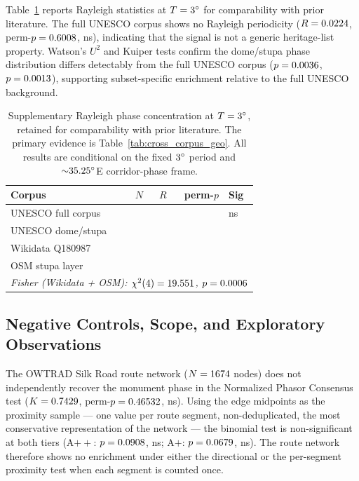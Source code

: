 \documentclass[12pt,a4paper]{article}
\newcommand{\degr}{\ifmmode^\circ\else\textdegree{}\fi}
\begin{document}
Table~\ref{tab:rayleigh_summary} reports Rayleigh statistics at
$T = 3\degr$ for comparability with prior literature. The full UNESCO
corpus shows no Rayleigh periodicity ($R = 0.0224{}$,
perm-$p = 0.6008{}$, ns), indicating that the signal is not a
generic heritage-list property. Watson's $U^2$ and Kuiper tests confirm
the dome/stupa phase distribution differs detectably from the full
UNESCO corpus ($p = 0.0036{}$,
$p = 0.0013{}$), supporting subset-specific enrichment relative to the full UNESCO background.

\begin{table}[ht]
\centering
\caption{Supplementary Rayleigh phase concentration at $T = 3\degr$,
retained for comparability with prior literature. The primary evidence
is Table~\ref{tab:cross_corpus_geo}. All results are conditional on
the fixed $3\degr$ period and ${\sim}35.25\degr$E corridor-phase frame.}
\label{tab:rayleigh_summary}
\small
\begin{tabular}{llrrl}
\toprule
Corpus & $N$ & $R$ & perm-$p$ & Sig \\
\midrule
UNESCO full corpus   & \NclusterTotal{} & \circConcUnescoR{} & \circConcUnescoP{} & ns \\
UNESCO dome/stupa    & \circTwoSampNDome{} & \circConcDomeR{} & \circConcDomeP{} & \circConcDomePSig{} \\
Wikidata Q180987     & \npcNStupa{} & \circConcStupaR{} & \circConcStupaP{} & \circConcStupaPSig{} \\
OSM stupa layer      & \osmStupaTotal{} & \osmStupaRayleighR{} & \osmStupaRayleighP{} & \osmStupaRayleighSig{} \\
\midrule
\multicolumn{5}{l}{\textit{Fisher (Wikidata + OSM): $\chi^2(4) = 19.551{}$, $p = 0.0006{}$}} \\
\bottomrule
\end{tabular}
\end{table}

\subsection{Negative Controls, Scope, and Exploratory Observations}

The OWTRAD Silk Road route network ($N = 1674{}$ nodes) does
not independently recover the monument phase in the Normalized Phasor
Consensus test ($K = 0.7429{}$, perm-$p = 0.46532{}$,
ns). Using the \NOwtradEdges{} edge midpoints as the proximity sample
--- one value per route segment, non-deduplicated, the most
conservative representation of the network --- the binomial test is
non-significant at both tiers (A$++$: $p = 0.0908{}$,
ns; A$+$: $p = 0.0679{}$, ns). The route network therefore
shows no enrichment under either the directional or the per-segment
proximity test when each segment is counted once.
\end{document}
